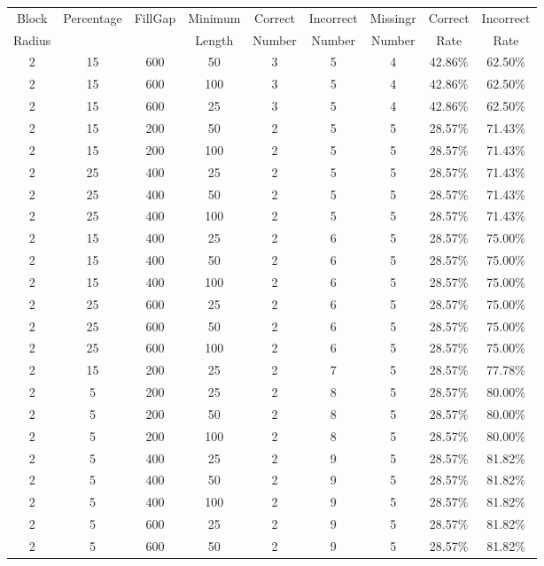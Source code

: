 \begin{center}
{\small
\begin{longtable}{| c | c | c | c | c | c | c | c | c |} \hline 
Block & Percentage & FillGap & Minimum & Correct & Incorrect & Missingr & Correct & Incorrect \\ 
Radius &  & & Length & Number & Number & Number & Rate & Rate \\ \hline
 2 & 15 & 600 & 50 & 3 & 5 & 4 & 42.86\% & 62.50\%   \\
 2 & 15 & 600 & 100 & 3 & 5 & 4 & 42.86\% & 62.50\%   \\
 2 & 15 & 600 & 25 & 3 & 5 & 4 & 42.86\% & 62.50\%   \\
 2 & 15 & 200 & 50 & 2 & 5 & 5 & 28.57\% & 71.43\%   \\
 2 & 15 & 200 & 100 & 2 & 5 & 5 & 28.57\% & 71.43\%   \\
 2 & 25 & 400 & 25 & 2 & 5 & 5 & 28.57\% & 71.43\%   \\
 2 & 25 & 400 & 50 & 2 & 5 & 5 & 28.57\% & 71.43\%   \\
 2 & 25 & 400 & 100 & 2 & 5 & 5 & 28.57\% & 71.43\%   \\
 2 & 15 & 400 & 25 & 2 & 6 & 5 & 28.57\% & 75.00\%   \\
 2 & 15 & 400 & 50 & 2 & 6 & 5 & 28.57\% & 75.00\%   \\
 2 & 15 & 400 & 100 & 2 & 6 & 5 & 28.57\% & 75.00\%   \\
 2 & 25 & 600 & 25 & 2 & 6 & 5 & 28.57\% & 75.00\%   \\
 2 & 25 & 600 & 50 & 2 & 6 & 5 & 28.57\% & 75.00\%   \\
 2 & 25 & 600 & 100 & 2 & 6 & 5 & 28.57\% & 75.00\%   \\
 2 & 15 & 200 & 25 & 2 & 7 & 5 & 28.57\% & 77.78\%   \\
 2 & 5 & 200 & 25 & 2 & 8 & 5 & 28.57\% & 80.00\%   \\
 2 & 5 & 200 & 50 & 2 & 8 & 5 & 28.57\% & 80.00\%   \\
 2 & 5 & 200 & 100 & 2 & 8 & 5 & 28.57\% & 80.00\%   \\
 2 & 5 & 400 & 25 & 2 & 9 & 5 & 28.57\% & 81.82\%   \\
 2 & 5 & 400 & 50 & 2 & 9 & 5 & 28.57\% & 81.82\%   \\
 2 & 5 & 400 & 100 & 2 & 9 & 5 & 28.57\% & 81.82\%   \\
 2 & 5 & 600 & 25 & 2 & 9 & 5 & 28.57\% & 81.82\%   \\
 2 & 5 & 600 & 50 & 2 & 9 & 5 & 28.57\% & 81.82\%   \\

\end{longtable}}
\end{center}
